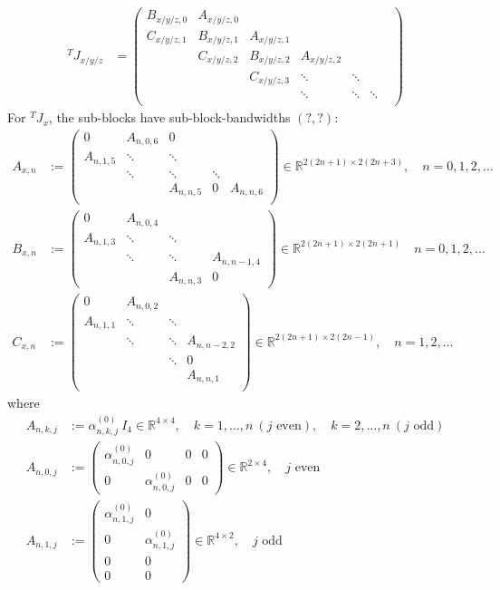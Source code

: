 \documentclass[11pt, oneside]{article}   	%
\newcommand{\R}{\mathbb{R}}
\newcommand{\jacobimattangent}{{}^T\!J}
\newcommand{\jacobimattangentx}{\jacobimattangent_x}
\newcommand{\alphao}{\alpha^{(0)}}
\newcommand{\alphaonkj}{\alphao_{n,k,j}}
\begin{document}
\begin{align*}
	\jacobimattangent_{x/y/z} &= 
		\begin{pmatrix}
			B_{x/y/z, 0} & A_{x/y/z, 0} & & & & \\
			C_{x/y/z, 1} & B_{x/y/z, 1} & A_{x/y/z, 1} & & & \\
			& C_{x/y/z, 2} & B_{x/y/z, 2} & A_{x/y/z, 2} & & & \\
			& & C_{x/y/z, 3} & \ddots & \ddots & \\
			& & & \ddots & \ddots & \ddots \\
		\end{pmatrix}
\end{align*}
For $\jacobimattangentx$, the sub-blocks have sub-block-bandwidths $(?,?)$:
\begin{align*}
	A_{x,n} &:= 
		\begin{pmatrix}
			0 & A_{n,0,6} & 0 & & \\
			A_{n,1,5} & \ddots & \ddots & & \\
			& \ddots & \ddots & \ddots & \\
			& & A_{n,n,5} & 0 & A_{n,n,6} \\
		\end{pmatrix} \in \R^{2(2n+1)\times2(2n+3)}, \quad n = 0,1,2,\dots \\
	B_{x,n} &:= 
		\begin{pmatrix}
			0 & A_{n,0,4} & & \\
			A_{n,1,3} & \ddots & \ddots & \\
			& \ddots & \ddots & A_{n,n-1,4} \\
			& & A_{n,n,3} & 0
		\end{pmatrix} \in \R^{2(2n+1)\times2(2n+1)}  \quad n = 0,1,2,\dots \\
	C_{x,n} &:= 
		\begin{pmatrix}
			0 & A_{n,0,2} & & \\
			A_{n,1,1} & \ddots & \ddots & \\
			& \ddots & \ddots & A_{n,n-2,2} \\
			& & \ddots & 0 \\
			& & & A_{n,n,1} \\
		\end{pmatrix} \in \R^{2(2n+1)\times2(2n-1)}, \quad n = 1,2,\dots
\end{align*}
where
\begin{align*}
	A_{n,k,j} &:= \alphaonkj \: I_{4} \in \R^{4\times4}, \quad k = 1,\dots,n \: (j \text{ even}), \quad k = 2,\dots,n \: (j \text{ odd}) \\
	A_{n,0,j} &:=
		\begin{pmatrix}
			\alphao_{n,0,j} & 0 & 0 & 0 \\
			0 & \alphao_{n,0,j} & 0 & 0
		\end{pmatrix} \in \R^{2\times4}, \quad j \text{ even} \\
	A_{n,1,j} &:=
		\begin{pmatrix}
			\alphao_{n,1,j} & 0 \\
			0 & \alphao_{n,1,j} \\
			0 & 0 \\
			0 & 0
		\end{pmatrix} \in \R^{4\times2}, \quad j \text{ odd}
\end{align*}
\end{document}
